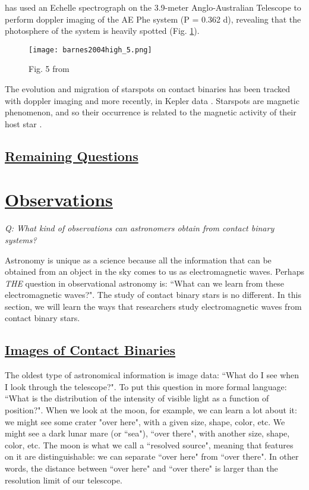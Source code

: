 \documentclass[12pt]{article} %
\numberwithin{equation}{section} %
\begin{document}
\citet{barnes2004high} has used an Echelle spectrograph on the 3.9-meter Anglo-Australian Telescope to perform doppler imaging of the AE Phe system (P = 0.362 d), revealing that the photosphere of the system is heavily spotted (Fig. \ref{fig: barnes2004high_5}).

\begin{figure}[H]
\centering
\texttt{[image: barnes2004high\_5.png]}
\caption{Fig. 5 from \citet{barnes2004high}}
\label{fig: barnes2004high_5}
\end{figure}

The evolution and migration of starspots on contact binaries has been tracked with doppler imaging \citep{hendry2000doppler} and more recently, in Kepler data \citep{tran2013anticorrelated, balaji2015tracking}. Starspots are magnetic phenomenon, and so their occurrence is related to the magnetic activity of their host star \citep{berdyugina2005starspots}.  

\subsection[Remaining Questions]{\hyperlink{toc}{Remaining Questions}} \label{sec: Remaining Questions}

\section[Observations]{\hyperlink{toc}{Observations}} \label{sec: observations}

\emph{Q: What kind of observations can astronomers obtain from contact binary systems?}

Astronomy is unique as a science because all the information that can be obtained from an object in the sky comes to us as electromagnetic waves. Perhaps \emph{THE} question in observational astronomy is: ``What can we learn from these electromagnetic waves?". The study of contact binary stars is no different. In this section, we will learn the ways that researchers study electromagnetic waves from contact binary stars.

\subsection[Images of Contact Binaries]{\hyperlink{toc}{Images of Contact Binaries}} \label{sec: Images of Contact Binaries}

The oldest type of astronomical information is image data: ``What do I see when I look through the telescope?". To put this question in more formal language: ``What is the distribution of the intensity of visible light as a function of position?". When we look at the moon, for example, we can learn a lot about it: we might see some crater "over here", with a given size, shape, color, etc. We might see a dark lunar mare (or ``sea"), ``over there", with another size, shape, color, etc. The moon is what we call a ``resolved source", meaning that features on it are distinguishable: we can separate ``over here" from ``over there". In other words, the distance between ``over here" and ``over there" is larger than the resolution limit of our telescope.
\end{document}

